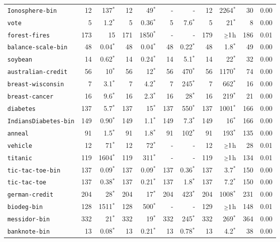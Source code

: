 \begin{tabular}{lrrrrrrrrrr}
\texttt{Ionosphere-bin} & 12 & 137$^*$ & 12 & 49$^*$ & - & - & 12 & 2264$^*$ & 30 & 0.00\\
\texttt{vote} & 5 & 1.2$^*$ & 5 & 0.36$^*$ & 5 & 7.6$^*$ & 5 & 21$^*$ & 8 & 0.00\\
\texttt{forest-fires} & 173 & 15 & 171 & 1850$^*$ & - & - & 179 & $\mathsmaller{\geq}1$h & 186 & 0.01\\
\texttt{balance-scale-bin} & 48 & 0.04$^*$ & 48 & 0.04$^*$ & 48 & 0.22$^*$ & 48 & 1.8$^*$ & 49 & 0.00\\
\texttt{soybean} & 14 & 0.62$^*$ & 14 & 0.24$^*$ & 14 & 5.1$^*$ & 14 & 22$^*$ & 32 & 0.00\\
\texttt{australian-credit} & 56 & 10$^*$ & 56 & 12$^*$ & 56 & 470$^*$ & 56 & 1170$^*$ & 74 & 0.00\\
\texttt{breast-wisconsin} & 7 & 3.1$^*$ & 7 & 4.2$^*$ & 7 & 245$^*$ & 7 & 662$^*$ & 16 & 0.00\\
\texttt{breast-cancer} & 16 & 9.6$^*$ & 16 & 2.3$^*$ & 16 & 28$^*$ & 16 & 219$^*$ & 21 & 0.00\\
\texttt{diabetes} & 137 & 5.7$^*$ & 137 & 15$^*$ & 137 & 550$^*$ & 137 & 1001$^*$ & 166 & 0.00\\
\texttt{IndiansDiabetes-bin} & 149 & 0.90$^*$ & 149 & 1.1$^*$ & 149 & 7.3$^*$ & 149 & 16$^*$ & 166 & 0.00\\
\texttt{anneal} & 91 & 1.5$^*$ & 91 & 1.8$^*$ & 91 & 102$^*$ & 91 & 193$^*$ & 135 & 0.00\\
\texttt{vehicle} & 12 & 71$^*$ & 12 & 72$^*$ & - & - & 12 & $\mathsmaller{\geq}1$h & 28 & 0.01\\
\texttt{titanic} & 119 & 1604$^*$ & 119 & 311$^*$ & - & - & 119 & $\mathsmaller{\geq}1$h & 134 & 0.01\\
\texttt{tic-tac-toe-bin} & 137 & 0.09$^*$ & 137 & 0.09$^*$ & 137 & 0.36$^*$ & 137 & 3.7$^*$ & 150 & 0.00\\
\texttt{tic-tac-toe} & 137 & 0.38$^*$ & 137 & 0.21$^*$ & 137 & 1.8$^*$ & 137 & 7.2$^*$ & 150 & 0.00\\
\texttt{german-credit} & 204 & 28$^*$ & 204 & 17$^*$ & 204 & 423$^*$ & 204 & 1008$^*$ & 231 & 0.00\\
\texttt{biodeg-bin} & 128 & 1511$^*$ & 128 & 500$^*$ & - & - & 129 & $\mathsmaller{\geq}1$h & 148 & 0.01\\
\texttt{messidor-bin} & 332 & 21$^*$ & 332 & 19$^*$ & 332 & 245$^*$ & 332 & 269$^*$ & 364 & 0.00\\
\texttt{banknote-bin} & 13 & 0.08$^*$ & 13 & 0.21$^*$ & 13 & 0.78$^*$ & 13 & 4.2$^*$ & 38 & 0.00\\

\end{tabular}
